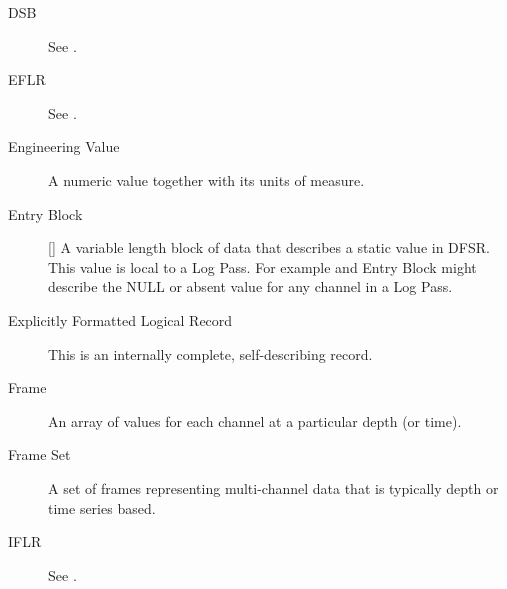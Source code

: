 \documentclass[letterpaper,10pt,english]{sphinxmanual}
\begin{document}
\begin{description}
\item[{DSB}] \leavevmode{}\label{\detokenize{glossary:term-dsb}}
See {\hyperref[\detokenize{glossary:term-datum-specification-block}]{}}.

\item[{EFLR}] \leavevmode{}\label{\detokenize{glossary:term-eflr}}
See {\hyperref[\detokenize{glossary:term-explicitly-formatted-logical-record}]{}}.

\item[{Engineering Value}] \leavevmode{}\label{\detokenize{glossary:term-engineering-value}}
A numeric value together with its units of measure.

\item[{Entry Block}] \leavevmode{}\label{\detokenize{glossary:term-entry-block}}
{[}{\hyperref[\detokenize{glossary:term-lis}]{}}{]} A variable length block of data that describes a static value in DFSR. This value is local to a Log Pass. For example and Entry Block might describe the NULL or absent value for any channel in a Log Pass.

\item[{Explicitly Formatted Logical Record}] \leavevmode{}\label{\detokenize{glossary:term-explicitly-formatted-logical-record}}
This is an internally complete, self-describing record.

\item[{Frame}] \leavevmode{}\label{\detokenize{glossary:term-frame}}
An array of values for each channel at a particular depth (or time).

\item[{Frame Set}] \leavevmode{}\label{\detokenize{glossary:term-frame-set}}
A set of frames representing multi-channel data that is typically depth or time series based.

\item[{IFLR}] \leavevmode{}\label{\detokenize{glossary:term-iflr}}
See {\hyperref[\detokenize{glossary:term-indirectly-formatted-logical-record}]{}}.


\end{description}
\end{document}
